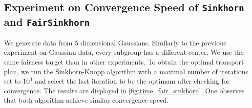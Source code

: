 \documentclass{article}
\theoremstyle{definition}
\begin{document}
\subsection{Experiment on Convergence Speed of \texttt{Sinkhorn} and \texttt{FairSinkhorn}}\label{app:cvg_speed}
We generate data from $5$ dimensional Gaussians. Similarly to the previous experiment on Gaussian data, every subgroup has a different center. We use the same fairness target than in other experiments. To obtain the optimal transport plan, we run the Sinkhorn-Knopp algorithm with a maximal number of iterations set to $10^4$ and select the last iteration to be the optimum after checking for convergence. The results are displayed in \cref{fig:time_fair_sinkhorn}. One observes that both algorithm achieve similar convergence speed.
\end{document}
